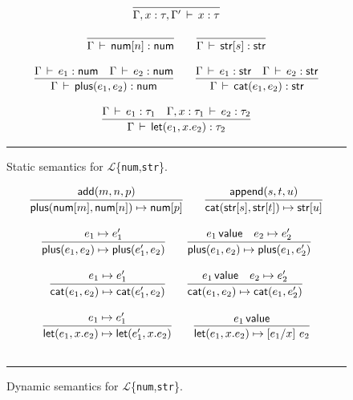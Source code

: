 \documentclass[11pt]{article}
\newcommand{\ms}[1]{\ensuremath{\mathsf{#1}}}
\newcommand{\anum}[1]{\ms{num}[#1]}
\newcommand{\astr}[1]{\ms{str}[#1]}
\newcommand{\anumn}{\anum{n}}
\newcommand{\astrs}{\astr{s}}
\newcommand{\aplus}[2]{\ms{plus}(#1, #2)}
\newcommand{\acat}[2]{\ms{cat}(#1, #2)}
\newcommand{\alet}[3]{\ms{let}(#1, #2.#3)}
\newcommand{\EXP}[0]{$\mathcal{L}$\{\texttt{num},\texttt{str}\}}
\newcommand{\typeof}[3]{\ensuremath{#1 \, \vdash \, #2 : #3}}
\newcommand{\tnum}{\ms{num}}
\newcommand{\tstr}{\ms{str}}
\newcommand{\steps}[2]{\ensuremath{#1 \mapsto #2}}
\newcommand{\val}[1]{\ensuremath{#1 \, \ms{value}}}
\newcommand{\sub}[3]{\ensuremath{[#2 / #1]\ #3}}
\begin{document}
\begin{figure}

\[
\begin{array}{c}
\infer{\typeof{\Gamma, x : \tau, \Gamma'}{x}{\tau}}{} \\
\\
\infer{\typeof{\Gamma}{\anumn}{\tnum}}{}
\qquad
\infer{\typeof{\Gamma}{\astrs}{\tstr}}{}\\
\\
\infer{\typeof{\Gamma}{\aplus{e_1}{e_2}}{\tnum}}{\typeof{\Gamma}{e_1}{\tnum} & \typeof{\Gamma}{e_2}{\tnum}}
\qquad
\infer{\typeof{\Gamma}{\acat{e_1}{e_2}}{\tstr}}{\typeof{\Gamma}{e_1}{\tstr} & \typeof{\Gamma}{e_2}{\tstr}} \\
\\
\infer{\typeof{\Gamma}{\alet{e_1}{x}{e_2}}{\tau_2}}{\typeof{\Gamma}{e_1}{\tau_1} & \typeof{\Gamma, x : \tau_1}{e_2}{\tau_2}}
\end{array}
\]

\hrule
\caption{Static semantics for \EXP.}
\label{fig:static-semantics}
\end{figure}

\begin{figure}

\[
\begin{array}{c}
\infer{\steps{\aplus{\anum{m}}{\anum{n}}}{\anum{p}}}{\mathsf{add}(m,n,p)}
\qquad
\infer{\steps{\acat{\astr{s}}{\astr{t}}}{\astr{u}}}{\mathsf{append}(s,t,u)} \\
\\
\infer{\steps{\aplus{e_1}{e_2}}{\aplus{e_1'}{e_2}}}{\steps{e_1}{e_1'}}
\qquad
\infer{\steps{\aplus{e_1}{e_2}}{\aplus{e_1}{e_2'}}}{\val{e_1} & \steps{e_2}{e_2'}}\\
\\
\infer{\steps{\acat{e_1}{e_2}}{\acat{e_1'}{e_2}}}{\steps{e_1}{e_1'}}
\qquad
\infer{\steps{\acat{e_1}{e_2}}{\acat{e_1}{e_2'}}}{\val{e_1} & \steps{e_2}{e_2'}}\\
\\
\infer{\steps{\alet{e_1}{x}{e_2}}{\alet{e_1'}{x}{e_2}}}{\steps{e_1}{e_1'}}
\qquad
\infer{\steps{\alet{e_1}{x}{e_2}}{\sub{x}{e_1}{e_2}}}{\val{e_1}}\\
\\
\end{array}
\]

\hrule
\caption{Dynamic semantics for \EXP.}
\label{fig:dynamic-semantics}
\end{figure}
\end{document}
